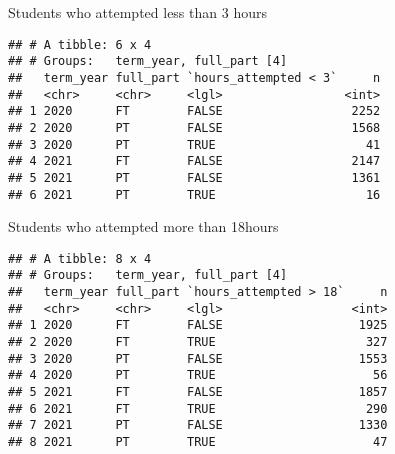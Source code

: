 \documentclass[]{article}
\newenvironment{Shaded}{\begin{snugshade}}{\end{snugshade}}
\newcommand{\DecValTok}[1]{\textcolor[rgb]{0.00,0.00,0.81}{#1}}
\newcommand{\KeywordTok}[1]{\textcolor[rgb]{0.13,0.29,0.53}{\textbf{#1}}}
\newcommand{\NormalTok}[1]{#1}
\newcommand{\OperatorTok}[1]{\textcolor[rgb]{0.81,0.36,0.00}{\textbf{#1}}}
\newcommand{\StringTok}[1]{\textcolor[rgb]{0.31,0.60,0.02}{#1}}
\begin{document}
Students who attempted less than 3 hours

\begin{Shaded}
\end{Shaded}

\begin{verbatim}
## # A tibble: 6 x 4
## # Groups:   term_year, full_part [4]
##   term_year full_part `hours_attempted < 3`     n
##   <chr>     <chr>     <lgl>                 <int>
## 1 2020      FT        FALSE                  2252
## 2 2020      PT        FALSE                  1568
## 3 2020      PT        TRUE                     41
## 4 2021      FT        FALSE                  2147
## 5 2021      PT        FALSE                  1361
## 6 2021      PT        TRUE                     16
\end{verbatim}

Students who attempted more than 18hours

\begin{Shaded}
\end{Shaded}

\begin{verbatim}
## # A tibble: 8 x 4
## # Groups:   term_year, full_part [4]
##   term_year full_part `hours_attempted > 18`     n
##   <chr>     <chr>     <lgl>                  <int>
## 1 2020      FT        FALSE                   1925
## 2 2020      FT        TRUE                     327
## 3 2020      PT        FALSE                   1553
## 4 2020      PT        TRUE                      56
## 5 2021      FT        FALSE                   1857
## 6 2021      FT        TRUE                     290
## 7 2021      PT        FALSE                   1330
## 8 2021      PT        TRUE                      47
\end{verbatim}
\end{document}
